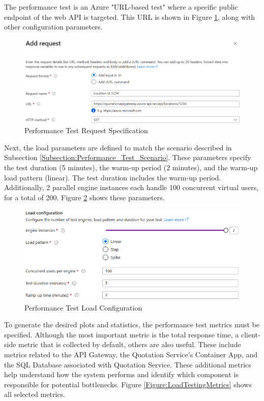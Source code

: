 \documentclass[12pt, reqno, oneside]{amsbook}
\theoremstyle{definition}
\theoremstyle{definition}
\numberwithin{section}{chapter}
\numberwithin{table}{chapter}
\numberwithin{figure}{chapter}
\begin{document}
The performance test is an Azure "URL-based test" where a specific public endpoint of the web \ac{API} is targeted. This \ac{URL} is shown in Figure \ref{Figure:LoadTestingRequestSpecification}, along with other configuration parameters.

\begin{figure}[H]
  \centering
  \includegraphics[width=1\linewidth]{images/LoadTestingRequestSpecification.png}
  \caption{\label{Figure:LoadTestingRequestSpecification}Performance Test Request Specification}
\end{figure}

Next, the load parameters are defined to match the scenario described in Subsection \ref{Subsection:Performance_Test_Scenario}. These parameters specify the test duration (5 minutes), the warm-up period (2 minutes), and the warm-up load pattern (linear). The test duration includes the warm-up period. Additionally, 2 parallel engine instances each handle 100 concurrent virtual users, for a total of 200. Figure \ref{Figure:LoadTestingLoadConfiguration} shows these parameters.

\begin{figure}[H]
  \centering
  \includegraphics[width=0.9\linewidth]{images/LoadTestingLoadConfiguration.png}
  \caption{\label{Figure:LoadTestingLoadConfiguration}Performance Test Load Configuration}
\end{figure}

To generate the desired plots and statistics, the performance test metrics must be specified. Although the most important metric is the total response time, a client-side metric that is collected by default, others are also useful. These include metrics related to the \ac{API} Gateway, the Quotation Service's Container App, and the SQL Database associated with Quotation Service. These additional metrics help understand how the system performs and identify which component is responsible for potential bottlenecks. Figure \ref{Figure:LoadTestingMetrics} shows all selected metrics.
\end{document}

